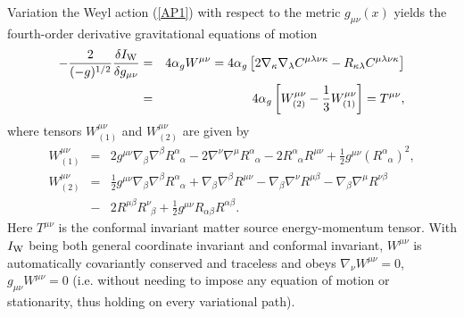 Variation the Weyl action (\ref{AP1}) with respect to the metric $g_{\mu\nu}(x)$ yields the fourth-order derivative gravitational equations of motion \cite{mannheim_2006} \cite{mannheim_1998}
%
\begin{eqnarray}
-\frac{2}{(-g)^{1/2}}\frac{\delta I_{\rm W}}{\delta g_{\mu\nu}}&=&4\alpha_g W^{\mu\nu}=4\alpha_g\left[2\nabla_{\kappa}\nabla_{\lambda}C^{\mu\lambda\nu\kappa}-
R_{\kappa\lambda}C^{\mu\lambda\nu\kappa}\right]
\nonumber\\
&=&4\alpha_g\left[W^{\mu
	\nu}_{(2)}-\frac{1}{3}W^{\mu\nu}_{(1)}\right]=T^{\mu\nu},
\label{AP3}
\end{eqnarray}
% 
where tensors $W^{\mu \nu}_{(1)}$ and $W^{\mu \nu}_{(2)}$ are given by
%                                                                               
\begin{eqnarray}
W^{\mu \nu}_{(1)}&=&
2g^{\mu\nu}\nabla_{\beta}\nabla^{\beta}R^{\alpha}_{\phantom{\alpha}\alpha}                                             
-2\nabla^{\nu}\nabla^{\mu}R^{\alpha}_{\phantom{\alpha}\alpha}                          
-2 R^{\alpha}_{\phantom{\alpha}\alpha}R^{\mu\nu}                              
+\frac{1}{2}g^{\mu\nu}(R^{\alpha}_{\phantom{\alpha}\alpha})^2,
\nonumber\\
W^{\mu \nu}_{(2)}&=&
\frac{1}{2}g^{\mu\nu}\nabla_{\beta}\nabla^{\beta}R^{\alpha}_{\phantom{\alpha}\alpha}
+\nabla_{\beta}\nabla^{\beta}R^{\mu\nu}                    
-\nabla_{\beta}\nabla^{\nu}R^{\mu\beta}                       
-\nabla_{\beta}\nabla^{\mu}R^{\nu \beta}  
\nonumber\\            
&-& 2R^{\mu\beta}R^{\nu}_{\phantom{\nu}\beta}                                    
+\frac{1}{2}g^{\mu\nu}R_{\alpha\beta}R^{\alpha\beta}.
\label{AP4}
\end{eqnarray}     
Here $T^{\mu\nu}$ is the conformal invariant matter source energy-momentum tensor. With $I_{\rm W}$ being both general coordinate invariant and conformal invariant, $W^{\mu\nu}$ is automatically covariantly conserved and traceless and obeys $\nabla_{\nu}W^{\mu\nu}=0$, $g_{\mu\nu}W^{\mu\nu}=0$ (i.e. without needing to impose any equation of motion or stationarity, thus holding on every variational path).                            

